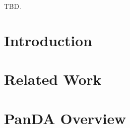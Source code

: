 \documentclass[10pt, conference, compsocconf]{IEEEtran}
\begin{document}
\begin{abstract}

\end{abstract}

\begin{IEEEkeywords}
TBD\@.
\end{IEEEkeywords}


%
\IEEEpeerreviewmaketitle


\section{Introduction}
\label{sec:intro}




\section{Related Work}
\label{sec:related}





\section{PanDA Overview}
\label{sec:panda_overview}




\end{document}
